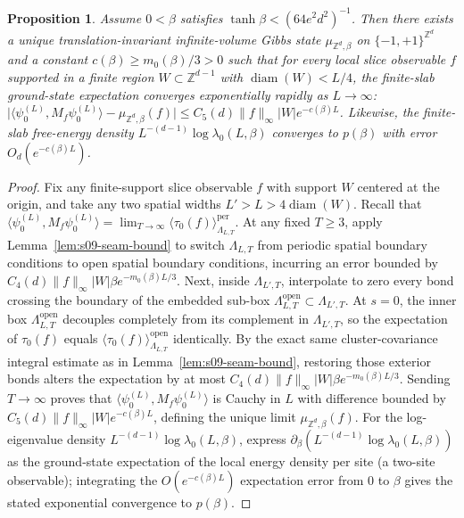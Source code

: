 \documentclass[11pt]{article}
\newtheorem{proposition}[theorem]{Proposition}
\theoremstyle{definition}
\begin{document}
\begin{proposition}
\label{prop:s09-ground-conv}
Assume $0 < \beta$ satisfies $\tanh \beta < (64 e^2 d^2)^{-1}$. Then there exists a
unique translation-invariant infinite-volume Gibbs state $\mu_{\mathbb{Z}^d, \beta}$
on $\{-1, +1\}^{\mathbb{Z}^d}$ and a constant $c(\beta) \ge m_0(\beta) / 3 > 0$ such
that for every local slice observable $f$ supported in a finite region $W \subset
\mathbb{Z}^{d-1}$ with $\operatorname{diam}(W) < L/4$, the finite-slab ground-state
expectation converges exponentially rapidly as $L \to \infty$: $\bigl|\langle
\psi_0^{(L)}, M_f \psi_0^{(L)} \rangle - \mu_{\mathbb{Z}^d, \beta}(f)\bigr| \le
C_5(d) \|f\|_\infty |W| e^{-c(\beta) L}$. Likewise, the finite-slab free-energy
density $L^{-(d-1)} \log \lambda_0(L, \beta)$ converges to $p(\beta)$ with error
$O_d(e^{-c(\beta) L})$.
\end{proposition}
\begin{proof}
Fix any finite-support slice observable $f$ with support $W$ centered at the origin,
and take any two spatial widths $L' > L > 4 \operatorname{diam}(W)$. Recall that
$\langle \psi_0^{(L)}, M_f \psi_0^{(L)} \rangle = \lim_{T \to \infty} \langle
\tau_0(f) \rangle_{\Lambda_{L,T}}^{\mathrm{per}}$. At any fixed $T \ge 3$, apply
Lemma~\ref{lem:s09-seam-bound} to switch $\Lambda_{L,T}$ from periodic spatial
boundary conditions to open spatial boundary conditions, incurring an error bounded
by $C_4(d) \|f\|_\infty |W| \beta e^{-m_0(\beta) L / 3}$. Next, inside
$\Lambda_{L',T}$, interpolate to zero every bond crossing the boundary of the
embedded sub-box $\Lambda_{L,T}^{\mathrm{open}} \subset \Lambda_{L',T}$. At $s = 0$,
the inner box $\Lambda_{L,T}^{\mathrm{open}}$ decouples completely from its
complement in $\Lambda_{L',T}$, so the expectation of $\tau_0(f)$ equals $\langle
\tau_0(f) \rangle_{\Lambda_{L,T}}^{\mathrm{open}}$ identically. By the exact same
cluster-covariance integral estimate as in Lemma~\ref{lem:s09-seam-bound}, restoring
those exterior bonds alters the expectation by at most $C_4(d) \|f\|_\infty |W|
\beta e^{-m_0(\beta) L / 3}$. Sending $T \to \infty$ proves that $\langle
\psi_0^{(L)}, M_f \psi_0^{(L)} \rangle$ is Cauchy in $L$ with difference bounded by
$C_5(d) \|f\|_\infty |W| e^{-c(\beta) L}$, defining the unique limit
$\mu_{\mathbb{Z}^d, \beta}(f)$. For the log-eigenvalue density $L^{-(d-1)} \log
\lambda_0(L, \beta)$, express $\partial_\beta (L^{-(d-1)} \log \lambda_0(L, \beta))$
as the ground-state expectation of the local energy density per site (a two-site
observable); integrating the $O(e^{-c(\beta) L})$ expectation error from $0$ to
$\beta$ gives the stated exponential convergence to $p(\beta)$.
\end{proof}
\end{document}
